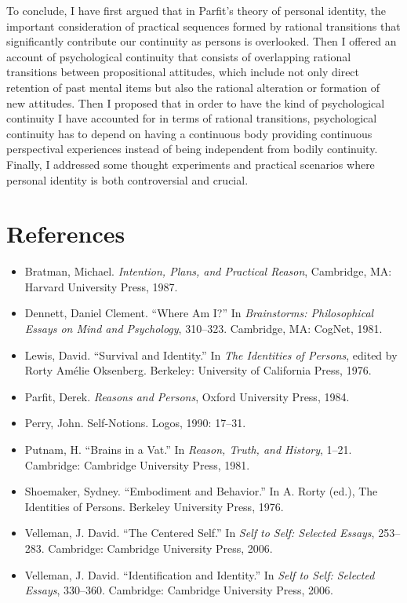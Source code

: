 To conclude, I have first argued that in Parfit's theory of personal
identity, the important consideration of practical sequences formed by
rational transitions that significantly contribute our continuity as
persons is overlooked. Then I offered an account of psychological
continuity that consists of overlapping rational transitions between
propositional attitudes, which include not only direct retention of past
mental items but also the rational alteration or formation of new
attitudes. Then I proposed that in order to have the kind of
psychological continuity I have accounted for in terms of rational
transitions, psychological continuity has to depend on having a
continuous body providing continuous perspectival experiences instead of
being independent from bodily continuity. Finally, I addressed some
thought experiments and practical scenarios where personal identity is
both controversial and crucial.

\clearpage
\section*{References}
{
\small
\begin{itemize}[label={},itemindent=-2em,leftmargin=2em]	
	\item Bratman, Michael. \emph{Intention, Plans, and Practical Reason},
Cambridge, MA: Harvard University Press, 1987.

	\item Dennett, Daniel Clement. ``Where Am I?'' In \emph{Brainstorms:
Philosophical Essays on Mind and Psychology}, 310--323. Cambridge, MA:
CogNet, 1981.


	\item Lewis, David. ``Survival and Identity.'' In \emph{The Identities of
Persons}, edited by Rorty Amélie Oksenberg. Berkeley: University of
California Press, 1976.

	\item Parfit, Derek. \emph{Reasons and Persons}, Oxford University Press,
1984.

	\item Perry, John. Self-Notions. Logos, 1990: 17--31.

	\item Putnam, H. ``Brains in a Vat.'' In \emph{Reason, Truth, and History},
1--21. Cambridge: Cambridge University Press, 1981.

	\item Shoemaker, Sydney. ``Embodiment and Behavior.'' In A. Rorty (ed.), The
Identities of Persons. Berkeley University Press, 1976.

	\item Velleman, J. David. ``The Centered Self.'' In \emph{Self to Self:
Selected Essays}, 253--283. Cambridge: Cambridge University Press, 2006.


	\item Velleman, J. David. ``Identification and Identity.'' In \emph{Self to
Self: Selected Essays}, 330--360. Cambridge: Cambridge University Press,
2006.
\end{itemize}
}



